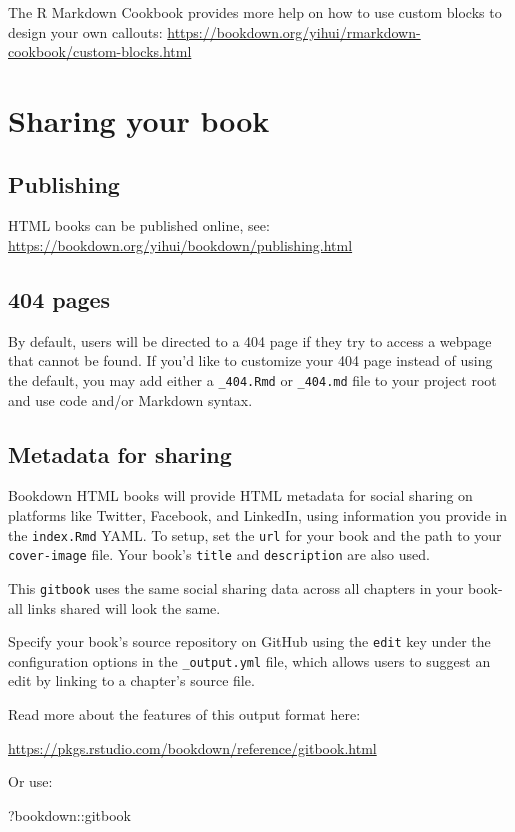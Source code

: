 \documentclass[
]{book}
\newenvironment{Shaded}{\begin{snugshade}}{\end{snugshade}}
\newcommand{\NormalTok}[1]{#1}
\newcommand{\SpecialCharTok}[1]{\textcolor[rgb]{0.00,0.00,0.00}{#1}}
\theoremstyle{definition}
\theoremstyle{definition}
\theoremstyle{definition}
\theoremstyle{definition}
\theoremstyle{remark}
\begin{document}
The R Markdown Cookbook provides more help on how to use custom blocks to design your own callouts: \url{https://bookdown.org/yihui/rmarkdown-cookbook/custom-blocks.html}

\hypertarget{sharing-your-book}{%
\chapter{Sharing your book}\label{sharing-your-book}}

\hypertarget{publishing}{%
\section{Publishing}\label{publishing}}

HTML books can be published online, see: \url{https://bookdown.org/yihui/bookdown/publishing.html}

\hypertarget{pages}{%
\section{404 pages}\label{pages}}

By default, users will be directed to a 404 page if they try to access a webpage that cannot be found. If you'd like to customize your 404 page instead of using the default, you may add either a \texttt{\_404.Rmd} or \texttt{\_404.md} file to your project root and use code and/or Markdown syntax.

\hypertarget{metadata-for-sharing}{%
\section{Metadata for sharing}\label{metadata-for-sharing}}

Bookdown HTML books will provide HTML metadata for social sharing on platforms like Twitter, Facebook, and LinkedIn, using information you provide in the \texttt{index.Rmd} YAML. To setup, set the \texttt{url} for your book and the path to your \texttt{cover-image} file. Your book's \texttt{title} and \texttt{description} are also used.

This \texttt{gitbook} uses the same social sharing data across all chapters in your book- all links shared will look the same.

Specify your book's source repository on GitHub using the \texttt{edit} key under the configuration options in the \texttt{\_output.yml} file, which allows users to suggest an edit by linking to a chapter's source file.

Read more about the features of this output format here:

\url{https://pkgs.rstudio.com/bookdown/reference/gitbook.html}

Or use:

\begin{Shaded}
\begin{Highlighting}[]
\NormalTok{?bookdown}\SpecialCharTok{::}\NormalTok{gitbook}
\end{Highlighting}
\end{Shaded}


  
\end{document}
